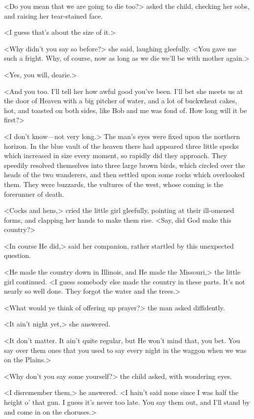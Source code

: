 <Do you mean that we are going to die too?> asked the child, checking her sobs, and raising her tear-stained face.

<I guess that's about the size of it.>

<Why didn't you say so before?> she said, laughing gleefully. <You gave me such a fright. Why, of course, now as long as we die we'll be with mother again.>

<Yes, you will, dearie.>

<And you too. I'll tell her how awful good you've been. I'll bet she meets us at the door of Heaven with a big pitcher of water, and a lot of buckwheat cakes, hot, and toasted on both sides, like Bob and me was fond of. How long will it be first?>

<I don't know—not very long.> The man's eyes were fixed upon the northern horizon. In the blue vault of the heaven there had appeared three little specks which increased in size every moment, so rapidly did they approach. They speedily resolved themselves into three large brown birds, which circled over the heads of the two wanderers, and then settled upon some rocks which overlooked them. They were buzzards, the vultures of the west, whose coming is the forerunner of death.

<Cocks and hens,> cried the little girl gleefully, pointing at their ill-omened forms, and clapping her hands to make them rise. <Say, did God make this country?>

<In course He did,> said her companion, rather startled by this unexpected question.

<He made the country down in Illinois, and He made the Missouri,> the little girl continued. <I guess somebody else made the country in these parts. It's not nearly so well done. They forgot the water and the trees.>

<What would ye think of offering up prayer?> the man asked diffidently.

<It ain't night yet,> she answered.

<It don't matter. It ain't quite regular, but He won't mind that, you bet. You say over them ones that you used to say every night in the waggon when we was on the Plains.>

<Why don't you say some yourself?> the child asked, with wondering eyes.

<I disremember them,> he answered. <I hain't said none since I was half the height o' that gun. I guess it's never too late. You say them out, and I'll stand by and come in on the choruses.>

